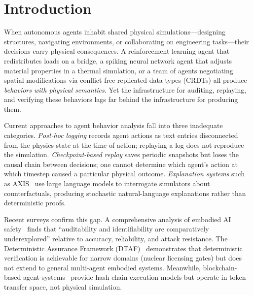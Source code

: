 \documentclass[sigconf,nonacm]{acmart}
\begin{document}


\maketitle

\section{Introduction}
\label{sec:intro}

When autonomous agents inhabit shared physical simulations---designing
structures, navigating environments, or collaborating on engineering
tasks---their decisions carry physical consequences. A reinforcement learning
agent that redistributes loads on a bridge, a spiking neural network agent
that adjusts material properties in a thermal simulation, or a team of agents
negotiating spatial modifications via conflict-free replicated data types
(CRDTs) all produce \emph{behaviors with physical semantics}. Yet the
infrastructure for auditing, replaying, and verifying these behaviors lags
far behind the infrastructure for producing them.

Current approaches to agent behavior analysis fall into three inadequate
categories. \emph{Post-hoc logging} records agent actions as text entries
disconnected from the physics state at the time of action; replaying a log
does not reproduce the simulation. \emph{Checkpoint-based replay} saves
periodic snapshots but loses the causal chain between decisions; one cannot
determine which agent's action at which timestep caused a particular physical
outcome. \emph{Explanation systems} such as AXIS~\cite{axis2025} use large
language models to interrogate simulators about counterfactuals, producing
stochastic natural-language explanations rather than deterministic proofs.

Recent surveys confirm this gap. A comprehensive analysis of embodied AI
safety~\cite{openreview2025} finds that ``auditability and identifiability
are comparatively underexplored'' relative to accuracy, reliability, and
attack resistance. The Deterministic Assurance Framework
(DTAF)~\cite{dtaf2025} demonstrates that deterministic verification is
achievable for narrow domains (nuclear licensing gates) but does not extend
to general multi-agent embodied systems. Meanwhile, blockchain-based agent
systems~\cite{blockchain-agents2025} provide hash-chain execution models
but operate in token-transfer space, not physical simulation.
\end{document}
